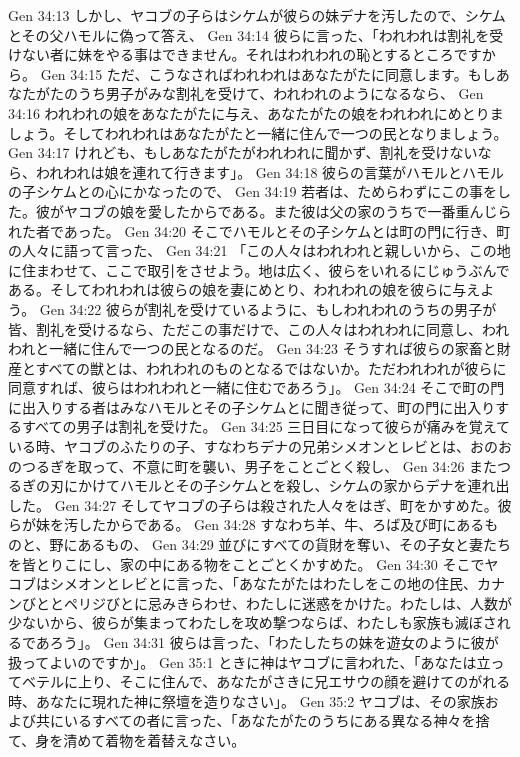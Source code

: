 Gen 34:13  しかし、ヤコブの子らはシケムが彼らの妹デナを汚したので、シケムとその父ハモルに偽って答え、
Gen 34:14  彼らに言った、「われわれは割礼を受けない者に妹をやる事はできません。それはわれわれの恥とするところですから。
Gen 34:15  ただ、こうなさればわれわれはあなたがたに同意します。もしあなたがたのうち男子がみな割礼を受けて、われわれのようになるなら、
Gen 34:16  われわれの娘をあなたがたに与え、あなたがたの娘をわれわれにめとりましょう。そしてわれわれはあなたがたと一緒に住んで一つの民となりましょう。
Gen 34:17  けれども、もしあなたがたがわれわれに聞かず、割礼を受けないなら、われわれは娘を連れて行きます」。
Gen 34:18  彼らの言葉がハモルとハモルの子シケムとの心にかなったので、
Gen 34:19  若者は、ためらわずにこの事をした。彼がヤコブの娘を愛したからである。また彼は父の家のうちで一番重んじられた者であった。
Gen 34:20  そこでハモルとその子シケムとは町の門に行き、町の人々に語って言った、
Gen 34:21  「この人々はわれわれと親しいから、この地に住まわせて、ここで取引をさせよう。地は広く、彼らをいれるにじゅうぶんである。そしてわれわれは彼らの娘を妻にめとり、われわれの娘を彼らに与えよう。
Gen 34:22  彼らが割礼を受けているように、もしわれわれのうちの男子が皆、割礼を受けるなら、ただこの事だけで、この人々はわれわれに同意し、われわれと一緒に住んで一つの民となるのだ。
Gen 34:23  そうすれば彼らの家畜と財産とすべての獣とは、われわれのものとなるではないか。ただわれわれが彼らに同意すれば、彼らはわれわれと一緒に住むであろう」。
Gen 34:24  そこで町の門に出入りする者はみなハモルとその子シケムとに聞き従って、町の門に出入りするすべての男子は割礼を受けた。
Gen 34:25  三日目になって彼らが痛みを覚えている時、ヤコブのふたりの子、すなわちデナの兄弟シメオンとレビとは、おのおのつるぎを取って、不意に町を襲い、男子をことごとく殺し、
Gen 34:26  またつるぎの刃にかけてハモルとその子シケムとを殺し、シケムの家からデナを連れ出した。
Gen 34:27  そしてヤコブの子らは殺された人々をはぎ、町をかすめた。彼らが妹を汚したからである。
Gen 34:28  すなわち羊、牛、ろば及び町にあるものと、野にあるもの、
Gen 34:29  並びにすべての貨財を奪い、その子女と妻たちを皆とりこにし、家の中にある物をことごとくかすめた。
Gen 34:30  そこでヤコブはシメオンとレビとに言った、「あなたがたはわたしをこの地の住民、カナンびととペリジびとに忌みきらわせ、わたしに迷惑をかけた。わたしは、人数が少ないから、彼らが集まってわたしを攻め撃つならば、わたしも家族も滅ぼされるであろう」。
Gen 34:31  彼らは言った、「わたしたちの妹を遊女のように彼が扱ってよいのですか」。
Gen 35:1  ときに神はヤコブに言われた、「あなたは立ってベテルに上り、そこに住んで、あなたがさきに兄エサウの顔を避けてのがれる時、あなたに現れた神に祭壇を造りなさい」。
Gen 35:2  ヤコブは、その家族および共にいるすべての者に言った、「あなたがたのうちにある異なる神々を捨て、身を清めて着物を着替えなさい。
